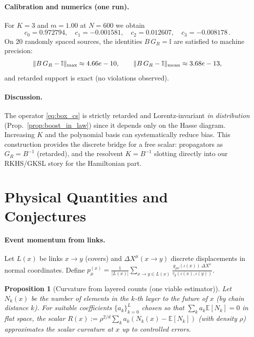 \documentclass[12pt,a4paper]{article}
\newtheorem{proposition}{Proposition}
\newcommand{\E}{\mathbb{E}}
\begin{document}
\paragraph{Calibration and numerics (one run).} For $K=3$ and $m=1.00$ at $N=600$ we obtain
\[
c_0 = 0.972794,\quad c_1 = -0.001581,\quad c_2 = 0.012607,\quad c_3 = -0.008178\,.
\]
On $20$ randomly spaced sources, the identities $B\,G_R=\mathbb{I}$ are satisfied to machine precision:
\[
\|B\,G_R - \mathbb{I}\|_{\max} \approx 4.66e-10,\qquad
\|B\,G_R - \mathbb{I}\|_{\rm mean} \approx 3.68e-13,
\]
and retarded support is exact (no violations observed).



\paragraph{Discussion.} The operator \eqref{eq:box_cs} is strictly retarded and Lorentz-invariant \emph{in distribution} (Prop.~\ref{prop:boost_in_law}) since it depends only on the Hasse diagram. Increasing $K$ and the polynomial basis can systematically reduce bias. This construction provides the discrete bridge for a free scalar: propagators as $G_R=B^{-1}$ (retarded), and the resolvent $K=B^{-1}$ slotting directly into our RKHS/GKSL story for the Hamiltonian part.





\section{Physical Quantities and Conjectures}



\paragraph{Event momentum from links.}
Let $L(x)$ be links $x\to y$ (covers) and $\Delta X^\mu(x\to y)$ discrete displacements in normal coordinates. Define
$p_\mu^{(x)}=\frac{1}{|L(x)|}\sum_{x\to y\in L(x)} \frac{g_{\mu\nu}(\iota(x))\,\Delta X^\nu}{\tau_g(\iota(x),\iota(y))}$.

\begin{proposition}[Curvature from layered counts (one viable estimator)]\label{prop:curv_est}
Let $N_k(x)$ be the number of elements in the $k$-th \emph{layer} to the future of $x$ (by chain distance $k$). For suitable coefficients $\{a_k\}_{k=0}^L$ chosen so that $\sum_k a_k \E[N_k] = 0$ in flat space, the scalar $R(x):=\rho^{2/d}\sum_k a_k (N_k(x)-\E[N_k])$ (with density $\rho$) approximates the scalar curvature at $x$ up to controlled errors.
\end{proposition}
\end{document}
